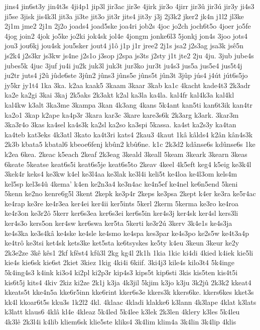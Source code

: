 {jins4
jin6st3y
jin4t3s
4ji4p1
jip3l
jir3ac
jir3e
4jirk
jir3o
4jirr
jir3û
jir3ú
jir3y
ji4s3
ji5se
3jisk
jis4k3l
jit3a
ji3te
jit3o
jit3r
jits4
jit3y
j3j
2j3k2
jker2
jk4n
j1l2
jl3ke
2j1m
jme2
2j1n
2j2o
joads4
joad5ske
joa4ri
job2s
4joc
jo2ch
joch6t5o
4joer
jo5fe
4jog
join2
4jok
jo5ke
jo2ki
jok4sk
jol4e
4jongm
jonke6l3
5jonkj
jon4s
3joo
jots4
jou3
jou6kj
jou4sk
jou5sker
jout4
j1ô
j1p
j1r
jree2
2j1s
jsa2
j2s3ag
jsa3k
jsê5n
js2k4
j2s3kr
js3kw
js4ne
j2s1o
j3sop
j2spa
js3ts
j2sty
j1t
jte2
2ju
4ju.
3jub
jube4s
jubes5k
4juc
3juf
ju4i
ju2k
juk3l
juk3t
jur3ko
jur3t
ju4s3
jus5a
jus5e4
jus5t4j
ju2tr
juts4
j2û
jûde6ste
3jûn2
jûns3
jûns5e
jûns5t
jûn3t
3jûp
jús4
j4út
jút6s5jo
jy5kr
jy1t4
1ka
3ka.
k2aa
kaak5
3kaam
3kaar
3kab
ka1c
4kacht
kade4t3
2k3adr
ka2e
ka2gi
3kai
3kaj
2k5aks
2k3akt
k2al
ka3la
ka4la.
kal4fr
kal4k3a
kal4kl
kal4kw
k3alt
3ka3me
3kampa
3kan
4k3ang
4kans
5k4ant
kan5ti
kan6t3ik
kan4tr
ka2o1
3kap
k2ape
ka4p3r
3kara
kar3c
3kare
kare3s6k
2k3arg
k3ark.
3kar3m
3ka3r4o
3kas
ka4sel
ka4s3k
ka2sl
ka2so
ka3spi
5kassa.
ka4st
ka2s3y
ka4tan
ka4teb
kat3eks
4k3atl
3kato
ka4t3ri
kats4
2kau3
4kaut
1kâ
kâlds4
k2ân
kân4s3k
2k3b
kbata5
kbatal6
kbeoe6fenj
kbûn2
kbû6ne.
k1c
2k3d2
kdânse6s
kdûnse6s
1ke
k2ea
6kea.
2keac
k5each
2keaf
2k3eag
3keald
3keall
5keam
3keark
3kearn
3keas
6keate
5keatse
keat6s5i
keat6s5je
keat6s5to
2keav
4keel
4k5eft
keg4
k5eig
ke3k4l
3kek4r
keks4
ke3kw
k4el
ke3l4aa
ke3lak
ke3l4i
keli5t
ke4loa
ke4l3om
kels4m
kel5sp
kel3s4û
4kema'
k4en
ke2n3a4
ke3n4ac
ke4n5ef
ke4nel
ke6n5end
5keni
5kenn
ke2no
kenre6g5l
3kent
2kepk
ke3p4r
2keps
ke3psa
2kept
k4er
ke3ra
ke5r4ac
ke4rap
ke3re
ke4r3ea
ker4ei
ker4ii
ker5ints
5kerl
2kerm
5kerma
ke3ro
ke4roa
ke4r3on
ke3r2ô
5kerr
ker6s3ea
ker6s3ei
ker6s5in
ker4s3j
ker4sk
ker4sl
kers3li
ker4s3o
kers5on
ker4sw
ker6swa
ker5ta
5kerti
ke3r2ú
3kerv
3k4e1s
ke4s3ja
ke4s3ka
ke3s4kâ
ke4ske
ke4sle
ke4smo
ke4spa
kes3par
ke4s3po
ke2s5w
ke4t3a4p
ke4trô
ke3tsi
ket4sk
kets3ke
ket5sta
ke6tsyskes
ke5ty
k4eu
3keun
3keur
ke2y
2k3e2ze
3kê
kês1
2kf
kfêst4
kfû3l
2kg
kg4l
2k1h
1kia
1kic
ki4di
4kied
k4iek
kie5li
kie4s
kie6sk
kie6st
2kiet
3kiez
1kig
4ki4i
6kiif.
3ki4j3
kile4s
kilo3t4
5k4inge
5k4ing4s3
k4ink
ki3o4
ki2pl
ki2p3r
kip4s3
kips5t
kip6sti
3kis
kis5ten
kis4t5i
kis6t5j
kits4
4kiv
2kiz
ki2ze
2k1j
k3ja
4k3jil
5kjim
k3jo
k3ju
3k2jû
2k3k2
kkeat4
kkeats5t
kke4n5a
kke6r5inn
kke6rint
kker6s3e
kkers3k
kkers6ke.
kkers6kes
kket3s
kk4l
kkoar6t5s
kku3s
1k2l2
4kl.
4klaac
4kladi
klakke6
k3lann
4k3lape
4klat
k3lats
k3latt
klaus6
4klâ
kl4e
4kleaz
5k4led
5k4lee
k3lek
2k3len
4klery
k3les
5k4leu
4k3lê
2k3l4i
k4lib
kliem6sk
klie5ste
kliks4
3k4lim
klim4a
3k4lin
3k4lip
4klis
}
